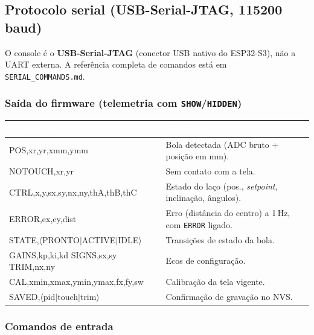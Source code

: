 \documentclass[11pt,a4paper,oneside]{article}
\newcommand{\rowstyle}{\rowcolor{rowgray}}
\begin{document}
\subsection{Protocolo serial (USB-Serial-JTAG, 115200 baud)}

O console é o \textbf{USB-Serial-JTAG} (conector USB nativo do ESP32-S3), não a
UART externa. A referência completa de comandos está em \texttt{SERIAL\_COMMANDS.md}.

\subsubsection{Saída do firmware (telemetria com \texttt{SHOW}/\texttt{HIDDEN})}

\begin{center}
\small
\renewcommand{\arraystretch}{1.2}
\begin{tabularx}{\textwidth}{>{\ttfamily\footnotesize}l >{\RaggedRight\arraybackslash}X}
\toprule
\rowcolor{primary}
\textcolor{white}{\normalfont\bfseries Mensagem} & \textcolor{white}{\normalfont\bfseries Significado} \\
\midrule
POS,xr,yr,xmm,ymm & Bola detectada (ADC bruto + posição em mm). \\
\rowstyle NOTOUCH,xr,yr & Sem contato com a tela. \\
CTRL,x,y,sx,sy,nx,ny,thA,thB,thC & Estado do laço (pos., \emph{setpoint}, inclinação, ângulos). \\
\rowstyle ERROR,ex,ey,dist & Erro (distância do centro) a 1\,Hz, com \texttt{ERROR} ligado. \\
STATE,$\langle$PRONTO$\vert$ACTIVE$\vert$IDLE$\rangle$ & Transições de estado da bola. \\
\rowstyle GAINS,kp,ki,kd \quad SIGNS,sx,sy \quad TRIM,nx,ny & Ecos de configuração. \\
CAL,xmin,xmax,ymin,ymax,fx,fy,sw & Calibração da tela vigente. \\
\rowstyle SAVED,$\langle$pid$\vert$touch$\vert$trim$\rangle$ & Confirmação de gravação no NVS. \\
\bottomrule
\end{tabularx}
\end{center}

\subsubsection{Comandos de entrada}
\end{document}
